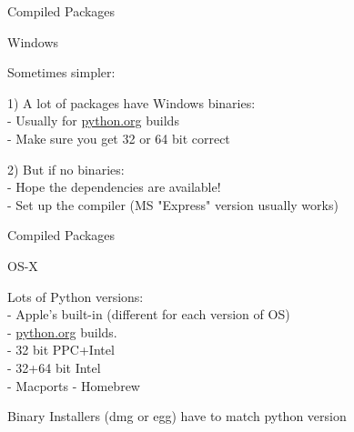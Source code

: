 \documentclass{beamer}
\begin{document}

\begin{frame}[fragile]{Compiled Packages}

{\LARGE Windows}

\vfill
{\Large Sometimes simpler:}

\vfill
{\Large 1) A lot of packages have Windows binaries:\\[0.1in]
            - Usually for \url{python.org} builds \\[0.1in]
            - Make sure you get 32 or 64 bit correct
}

\vfill
{\Large 2) But if no binaries: \\[0.1in]
           - Hope the dependencies are available!\\[0.1in]
           - Set up the compiler (MS "Express" version usually works)
}

\end{frame} 

\begin{frame}[fragile]{Compiled Packages}

{\LARGE OS-X}

\vfill
{\Large Lots of Python versions:\\[0.1in]
  - Apple's built-in (different for each version of OS)\\[0.1in]
  - \url{python.org} builds.\\
  \hspace{0.5in}- 32 bit PPC+Intel\\
  \hspace{0.5in}- 32+64 bit Intel\\[0.1in]
  - Macports
  - Homebrew
}


\vfill
{\Large Binary Installers (dmg or egg) have to match python version}

\end{frame} 
\end{document}
